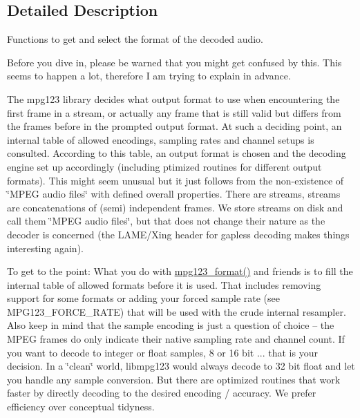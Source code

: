 \subsection{Detailed Description}
Functions to get and select the format of the decoded audio.

Before you dive in, please be warned that you might get confused by this. This seems to happen a lot, therefore I am trying to explain in advance.

The mpg123 library decides what output format to use when encountering the first frame in a stream, or actually any frame that is still valid but differs from the frames before in the prompted output format. At such a deciding point, an internal table of allowed encodings, sampling rates and channel setups is consulted. According to this table, an output format is chosen and the decoding engine set up accordingly (including ptimized routines for different output formats). This might seem unusual but it just follows from the non-\/existence of \char`\"{}\+M\+P\+E\+G audio files\char`\"{} with defined overall properties. There are streams, streams are concatenations of (semi) independent frames. We store streams on disk and call them \char`\"{}\+M\+P\+E\+G audio files\char`\"{}, but that does not change their nature as the decoder is concerned (the L\+A\+M\+E/\+Xing header for gapless decoding makes things interesting again).

To get to the point\+: What you do with \hyperlink{group__mpg123__output_ga9e614a7d7c1de12e981d8f7add9a2d4b}{mpg123\+\_\+format()} and friends is to fill the internal table of allowed formats before it is used. That includes removing support for some formats or adding your forced sample rate (see M\+P\+G123\+\_\+\+F\+O\+R\+C\+E\+\_\+\+R\+A\+TE) that will be used with the crude internal resampler. Also keep in mind that the sample encoding is just a question of choice -- the M\+P\+EG frames do only indicate their native sampling rate and channel count. If you want to decode to integer or float samples, 8 or 16 bit ... that is your decision. In a \char`\"{}clean\char`\"{} world, libmpg123 would always decode to 32 bit float and let you handle any sample conversion. But there are optimized routines that work faster by directly decoding to the desired encoding / accuracy. We prefer efficiency over conceptual tidyness.

